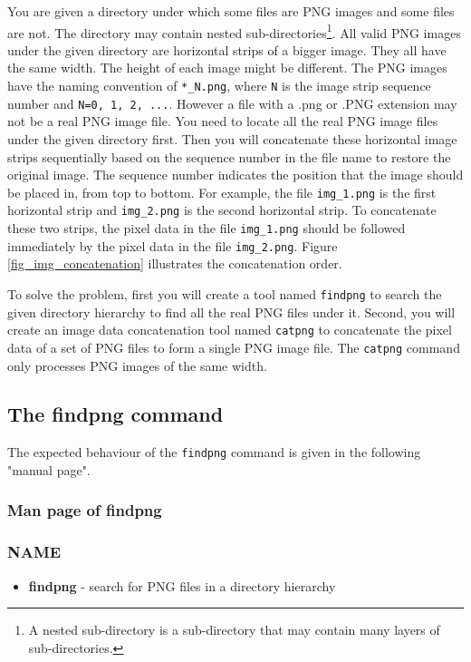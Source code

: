 You are given a directory under which some files are PNG images and some files are not. The directory may contain nested sub-directories\footnote{A nested sub-directory is a sub-directory that may contain many layers of sub-directories.}. All valid PNG images under the given directory are horizontal strips of a bigger image. They all have the same width. The height of each image might be different. The PNG images have the naming convention of \verb+*_N.png+, where \verb+N+ is the image strip sequence number and \verb+N=0, 1, 2, ...+. However a file with a .png or .PNG extension may not be a real PNG image file. You need to locate all the real PNG image files under the given directory first. Then you will concatenate these horizontal image strips sequentially based on the sequence number in the file name to restore the original image. The sequence number indicates the position that the image should be placed in, from top to bottom. For example, the file \verb+img_1.png+ is the first horizontal strip and \verb+img_2.png+ is the second horizontal strip. To concatenate these two strips, the pixel data in the file \verb+img_1.png+ should be followed immediately by the pixel data in the file \verb+img_2.png+. Figure \ref{fig_img_concatenation} illustrates the concatenation order.

To solve the problem, first you will create a tool named \verb+findpng+ to search the given directory hierarchy to find all the real PNG files under it. Second, you will create an image data concatenation tool named \verb+catpng+ to concatenate the pixel data of a set of PNG files to form a single PNG image file. The \verb+catpng+ command only processes PNG images of the same width.
\subsection{The findpng command}
The expected behaviour of the \verb+findpng+ command is given in the following "manual page".
\subsubsection{Man page of findpng}
\subsubsection*{NAME}
\begin{itemize}
	\item[]{\bf findpng} - search for PNG files in a directory hierarchy
\end{itemize}
